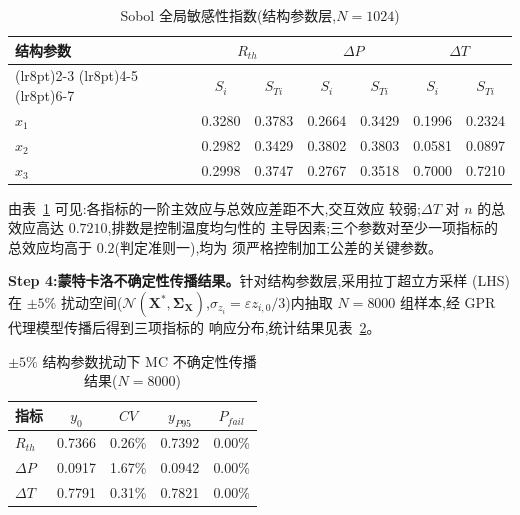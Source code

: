 \begin{table}[htbp]
  \centering
  \caption{Sobol 全局敏感性指数(结构参数层,$N=1024$)}
  \label{tab:sobol}
  \begin{tabular}{lcccccc}
    \toprule
    \multirow{2}{*}{结构参数} & \multicolumn{2}{c}{$R_{th}$} & \multicolumn{2}{c}{$\Delta P$} & \multicolumn{2}{c}{$\Delta T$}                                \\
    \cmidrule(lr{8pt}){2-3} \cmidrule(lr{8pt}){4-5} \cmidrule(lr{8pt}){6-7}
                          & $S_i$                        & $S_{Ti}$                       & $S_i$                          & $S_{Ti}$ & $S_i$  & $S_{Ti}$ \\
    \midrule
    $x_1$                 & 0.3280                       & 0.3783                         & 0.2664                         & 0.3429   & 0.1996 & 0.2324   \\
    $x_2$                 & 0.2982                       & 0.3429                         & 0.3802                         & 0.3803   & 0.0581 & 0.0897   \\
    $x_3$                 & 0.2998                       & 0.3747                         & 0.2767                         & 0.3518   & 0.7000 & 0.7210   \\
    \bottomrule
  \end{tabular}
\end{table}

由表~\ref{tab:sobol} 可见:各指标的一阶主效应与总效应差距不大,交互效应
较弱;$\Delta T$ 对 $n$ 的总效应高达 $0.7210$,排数是控制温度均匀性的
主导因素;三个参数对至少一项指标的总效应均高于 $0.2$(判定准则一),均为
须严格控制加工公差的关键参数。

\textbf{Step 4:蒙特卡洛不确定性传播结果。}针对结构参数层,采用拉丁超立方采样
(LHS)在 $\pm 5\%$ 扰动空间($\mathcal{N}(\mathbf{X}^*,
  \boldsymbol{\Sigma}_{\mathbf{X}})$,$\sigma_{z_i}=\varepsilon
  z_{i,0}/3$)内抽取 $N=8000$ 组样本,经 GPR 代理模型传播后得到三项指标的
响应分布,统计结果见表~\ref{tab:mc-results}。

\begin{table}[htbp]
  \centering
  \caption{$\pm 5\%$ 结构参数扰动下 MC 不确定性传播结果($N=8000$)}
  \label{tab:mc-results}
  \begin{tabular}{lcccc}
    \toprule
    指标         & $y_0$  & $CV$   & $y_{P95}$ & $P_{fail}$ \\
    \midrule
    $R_{th}$   & 0.7366 & 0.26\% & 0.7392    & 0.00\%     \\
    $\Delta P$ & 0.0917 & 1.67\% & 0.0942    & 0.00\%     \\
    $\Delta T$ & 0.7791 & 0.31\% & 0.7821    & 0.00\%     \\
    \bottomrule
  \end{tabular}
\end{table}

